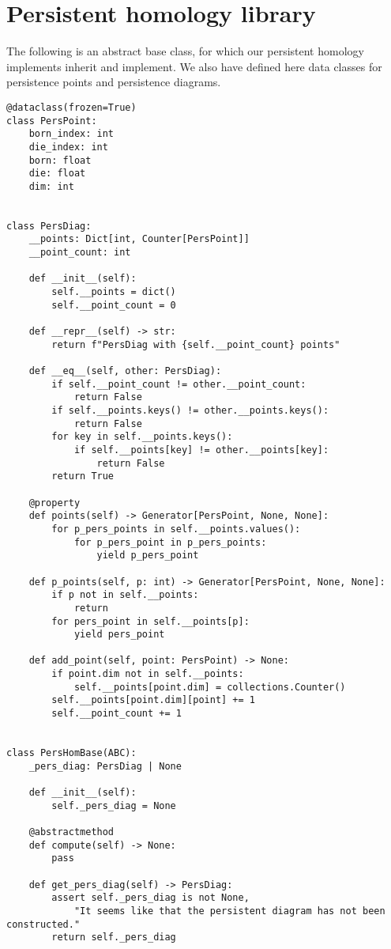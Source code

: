 \section{Persistent homology library}

The following is an abstract base class, for which our persistent homology implements inherit and implement. We also have defined here data classes for persistence points and persistence diagrams.

\begin{verbatim}
@dataclass(frozen=True)
class PersPoint:
    born_index: int
    die_index: int
    born: float
    die: float
    dim: int


class PersDiag:
    __points: Dict[int, Counter[PersPoint]]
    __point_count: int

    def __init__(self):
        self.__points = dict()
        self.__point_count = 0

    def __repr__(self) -> str:
        return f"PersDiag with {self.__point_count} points"

    def __eq__(self, other: PersDiag):
        if self.__point_count != other.__point_count:
            return False
        if self.__points.keys() != other.__points.keys():
            return False
        for key in self.__points.keys():
            if self.__points[key] != other.__points[key]:
                return False
        return True

    @property
    def points(self) -> Generator[PersPoint, None, None]:
        for p_pers_points in self.__points.values():
            for p_pers_point in p_pers_points:
                yield p_pers_point

    def p_points(self, p: int) -> Generator[PersPoint, None, None]:
        if p not in self.__points:
            return
        for pers_point in self.__points[p]:
            yield pers_point

    def add_point(self, point: PersPoint) -> None:
        if point.dim not in self.__points:
            self.__points[point.dim] = collections.Counter()
        self.__points[point.dim][point] += 1
        self.__point_count += 1


class PersHomBase(ABC):
    _pers_diag: PersDiag | None

    def __init__(self):
        self._pers_diag = None

    @abstractmethod
    def compute(self) -> None:
        pass

    def get_pers_diag(self) -> PersDiag:
        assert self._pers_diag is not None, 
            "It seems like that the persistent diagram has not been constructed."
        return self._pers_diag
\end{verbatim}

